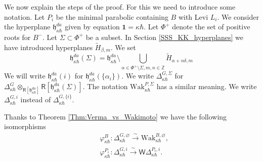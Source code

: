 \documentclass{amsart}
\theoremstyle{definition}
\newcommand{\sss}{\subsubsection{}}
\newcommand{\on}{\mathrm}
\newcommand{\Ring}{\mathsf{R}}
\newcommand{\g}{\mathfrak{g}}
\newcommand{\h}{\mathfrak{h}}
\newcommand{\Z}{\mathbb{Z}}
\newcommand{\Wak}{\on{Wak}}
\newcommand{\bone}{\mathbf{1}}
\newcommand{\WakDelta}{\mathsf{W}\Delta}
\numberwithin{equation}{section}
\begin{document}
\sss
We now explain the steps of the proof. For this we need to introduce some notation. Let $P_i$ be the minimal parabolic containing $B$ with Levi $L_i$. We consider the hyperplane $\h^{da}_{\kappa\hbar}$ given by equation $\bone=\kappa\hbar$. Let $\Phi^+$ denote the set of positive roots for $B^-$. Let $\Sigma\subset \Phi^+$ be a subset. In Section \ref{SSS_KK_hyperplanes} we have introduced hyperplanes $\tilde{H}_{\beta,m}$.
We set
\begin{equation}
\h^{da}_{\kappa\hbar}(\Sigma)=\h^{da}_{\kappa\hbar}\setminus\bigcup_{\alpha\in \Phi^+\setminus\Sigma, m,n\in \Z}\widetilde{H}_{\alpha+n\delta,m}
\end{equation}
We will write $\h^{da}_{\kappa\hbar}(i)$ for 
$\h^{da}_{\kappa\hbar}(\{\alpha_i\})$.
We write $\Delta^{G,\Sigma}_{\kappa\hbar}$ for $\Delta^{G}_{\kappa\hbar}\otimes_{\Ring[\h^{da}_{\kappa\hbar}]}
\Ring[\h^{da}_{\kappa\hbar}(\Sigma)]$. The notation 
$\Wak^{P,\Sigma}_{\kappa\hbar}$ has a similar meaning. We write $\Delta_{\kappa\hbar}^{G,i}$ instead of $\Delta_{\kappa\hbar}^{G,\{i\}}$.

Thanks to Theorem \ref{Thm:Verma_vs_Wakimoto} we have the following isomorphisms
\begin{align}\label{eq:isom_Delta_Wak_gen}
& \varphi^B_{\kappa\hbar}: \Delta^{G,\varnothing}_{\kappa\hbar}\xrightarrow{\sim}  \Wak^{B,\varnothing}_{\kappa\hbar},\\\label{eq:isom_Delta_WakDelta_igen}
& \varphi^{P_i}_{\kappa\hbar}: \Delta^{G,i}_{\kappa\hbar}\xrightarrow{\sim}  \WakDelta^{P_i,i}_{\kappa\hbar}.
\end{align}
\end{document}
